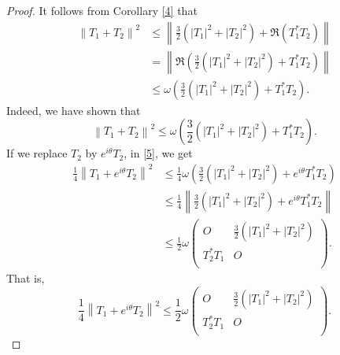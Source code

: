 \documentclass[12pt,twoside,reqno]{amsart}
\numberwithin{equation}{section}
\begin{document}
\begin{proof}
It follows from Corollary \ref{4} that
	\[\begin{aligned}
   {{\left\| {{T}_{1}}+{{T}_{2}} \right\|}^{2}}&\le \left\| \frac{3}{2}\left( {{\left| {{T}_{1}} \right|}^{2}}+{{\left| {{T}_{2}} \right|}^{2}} \right)+\Re\left( T_{1}^{*}{{T}_{2}} \right) \right\| \\ 
 & =\left\| \Re\left( \frac{3}{2}\left( {{\left| {{T}_{1}} \right|}^{2}}+{{\left| {{T}_{2}} \right|}^{2}} \right)+T_{1}^{*}{{T}_{2}} \right) \right\| \\ 
 & \le \omega \left( \frac{3}{2}\left( {{\left| {{T}_{1}} \right|}^{2}}+{{\left| {{T}_{2}} \right|}^{2}} \right)+T_{1}^{*}{{T}_{2}} \right).  
\end{aligned}\]
Indeed, we have shown that
\begin{equation}\label{5}
{{\left\| {{T}_{1}}+{{T}_{2}} \right\|}^{2}}\le \omega \left( \frac{3}{2}\left( {{\left| {{T}_{1}} \right|}^{2}}+{{\left| {{T}_{2}} \right|}^{2}} \right)+T_{1}^{*}{{T}_{2}} \right).
\end{equation}
If we replace ${{T}_{2}}$ by ${{e}^{i\theta }}{{T}_{2}}$, in \eqref{5}, we get
	\[\begin{aligned}
   \frac{1}{4}{{\left\| {{T}_{1}}+{{e}^{i\theta }}{{T}_{2}} \right\|}^{2}}&\le \frac{1}{4}\omega \left( \frac{3}{2}\left( {{\left| {{T}_{1}} \right|}^{2}}+{{\left| {{T}_{2}} \right|}^{2}} \right)+{{e}^{i\theta }}T_{1}^{*}{{T}_{2}} \right) \\ 
 & \le \frac{1}{4}\left\| \frac{3}{2}\left( {{\left| {{T}_{1}} \right|}^{2}}+{{\left| {{T}_{2}} \right|}^{2}} \right)+{{e}^{i\theta }}T_{1}^{*}{{T}_{2}} \right\| \\ 
 & \le \frac{1}{2}\omega \left( \begin{matrix}
   O & \frac{3}{2}\left( {{\left| {{T}_{1}} \right|}^{2}}+{{\left| {{T}_{2}} \right|}^{2}} \right)  \\
   T_{2}^{*}{{T}_{1}} & O  \\
\end{matrix} \right).  
\end{aligned}\]
That is,
	\[\frac{1}{4}{{\left\| {{T}_{1}}+{{e}^{i\theta }}{{T}_{2}} \right\|}^{2}}\le \frac{1}{2}\omega \left( \begin{matrix}
   O & \frac{3}{2}\left( {{\left| {{T}_{1}} \right|}^{2}}+{{\left| {{T}_{2}} \right|}^{2}} \right)  \\
   T_{2}^{*}{{T}_{1}} & O  \\
\end{matrix} \right).\]

\end{proof}
\end{document}
